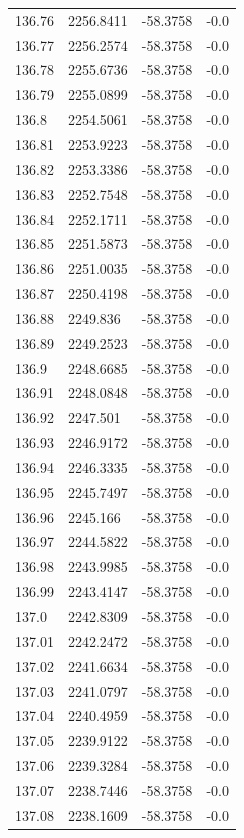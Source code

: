 \begin{table}[H]
\begin{tabular}{llll}
136.76 & 2256.8411 & -58.3758 & -0.0 \\
136.77 & 2256.2574 & -58.3758 & -0.0 \\
136.78 & 2255.6736 & -58.3758 & -0.0 \\
136.79 & 2255.0899 & -58.3758 & -0.0 \\
136.8 & 2254.5061 & -58.3758 & -0.0 \\
136.81 & 2253.9223 & -58.3758 & -0.0 \\
136.82 & 2253.3386 & -58.3758 & -0.0 \\
136.83 & 2252.7548 & -58.3758 & -0.0 \\
136.84 & 2252.1711 & -58.3758 & -0.0 \\
136.85 & 2251.5873 & -58.3758 & -0.0 \\
136.86 & 2251.0035 & -58.3758 & -0.0 \\
136.87 & 2250.4198 & -58.3758 & -0.0 \\
136.88 & 2249.836 & -58.3758 & -0.0 \\
136.89 & 2249.2523 & -58.3758 & -0.0 \\
136.9 & 2248.6685 & -58.3758 & -0.0 \\
136.91 & 2248.0848 & -58.3758 & -0.0 \\
136.92 & 2247.501 & -58.3758 & -0.0 \\
136.93 & 2246.9172 & -58.3758 & -0.0 \\
136.94 & 2246.3335 & -58.3758 & -0.0 \\
136.95 & 2245.7497 & -58.3758 & -0.0 \\
136.96 & 2245.166 & -58.3758 & -0.0 \\
136.97 & 2244.5822 & -58.3758 & -0.0 \\
136.98 & 2243.9985 & -58.3758 & -0.0 \\
136.99 & 2243.4147 & -58.3758 & -0.0 \\
137.0 & 2242.8309 & -58.3758 & -0.0 \\
137.01 & 2242.2472 & -58.3758 & -0.0 \\
137.02 & 2241.6634 & -58.3758 & -0.0 \\
137.03 & 2241.0797 & -58.3758 & -0.0 \\
137.04 & 2240.4959 & -58.3758 & -0.0 \\
137.05 & 2239.9122 & -58.3758 & -0.0 \\
137.06 & 2239.3284 & -58.3758 & -0.0 \\
137.07 & 2238.7446 & -58.3758 & -0.0 \\
137.08 & 2238.1609 & -58.3758 & -0.0 \\

\end{tabular}
\end{table}
